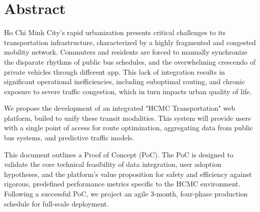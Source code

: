 \thispagestyle{plain}

\section*{Abstract}
\label{sec:abstract}
Ho Chi Minh City's rapid urbanization presents critical challenges to its transportation infrastructure, characterized by a highly fragmented and congested mobility network. Commuters and residents are forced to manually synchronize the disparate rhythms of public bus schedules, and the overwhelming crescendo of private vehicles through different app. This lack of integration results in significant operational inefficiencies, including suboptimal routing, and chronic exposure to severe traffic congestion, which in turn impacts urban quality of life.

We propose the development of an integrated "HCMC Transportation" web platform, builed to unify these transit modalities. This system will provide users with a single point of access for route optimization, aggregating data from public bus systems, and predictive traffic models.

This document outlines a Proof of Concept (PoC). The PoC is designed to validate the core technical feasibility of data integration, user adoption hypotheses, and the platform's value proposition for safety and efficiency against rigorous, predefined performance metrics specific to the HCMC environment. Following a successful PoC, we project an agile 3-month, four-phase production schedule for full-scale deployment.

